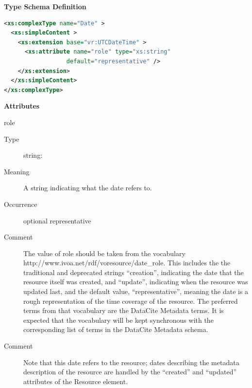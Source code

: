 \documentclass[11pt,a4paper]{ivoa}
\begin{document}
\begin{generated}
\begingroup
      	\renewcommand*\descriptionlabel[1]{%
      	\hbox to 5.5em{\emph{#1}\hfil}}\vspace{1ex}\noindent\textbf{ Type Schema Definition}

\begin{lstlisting}[language=XML,basicstyle=\footnotesize]
<xs:complexType name="Date" >
  <xs:simpleContent >
    <xs:extension base="vr:UTCDateTime" >
      <xs:attribute name="role" type="xs:string"
                  default="representative" />
    </xs:extension>
  </xs:simpleContent>
</xs:complexType>
\end{lstlisting}

\vspace{0.5ex}\noindent\textbf{ Attributes}

\begingroup\small\begin{bigdescription}
\item[role]
\begin{description}
\item[Type] string: 
\item[Meaning] 
                 A string indicating what the date refers to.  
               
\item[Occurrence] optional
representative
\item[Comment] 
               	The value of role should be taken from the vocabulary
               	http://www.ivoa.net/rdf/voresource/date\_role.
               	This includes the the traditional and deprecated strings
                “creation”, indicating the date that the resource 
                itself was created, and “update”, indicating when the
                resource was updated last, and the default value,
                “representative”, meaning the date is a rough 
                representation of the time coverage of the resource.
                The preferred terms from that vocabulary are the DataCite
                Metadata terms.   It is expected that the vocabulary will 
                be kept synchronous with the corresponding list of terms
                in the DataCite Metadata schema.
               
\item[Comment] 
                 Note that this date refers to the resource; dates describing
                 the metadata description of the resource are handled by
                 the “created” and “updated” attributes of the Resource 
                 element. 
               
\end{description}


\end{bigdescription}\endgroup

\endgroup
\end{generated}
\end{document}
